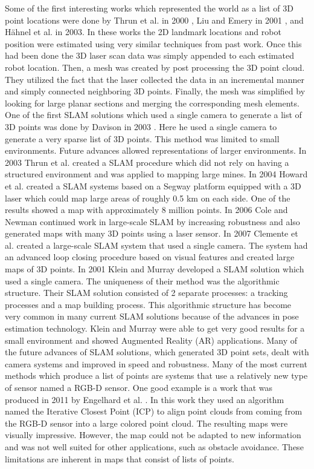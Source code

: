Some of the first interesting works which represented the world as a list
of 3D point locations were done by Thrun et al. in 2000 \cite{Thrun2000},
Liu and Emery in 2001 \cite{Liu2001}, and H\"{a}hnel et al. in 2003. In
these works the 2D landmark locations and robot position were estimated
using very similar techniques from past work. Once this had been done the 3D
laser scan data was simply appended to each estimated robot location. Then,
a mesh was created by post processing the 3D point cloud. They utilized the
fact that the laser collected the data in an incremental manner and simply
connected neighboring 3D points. Finally, the mesh was simplified by
looking for large planar sections and merging the corresponding mesh
elements. One of the first SLAM solutions which used a single camera to
generate a list of 3D points was done by Davison in 2003
\cite{Davison2003}. Here he used a single camera to generate a very sparse
list of 3D points. This method was limited to small environments. Future
advances allowed representations of larger environments. In 2003 Thrun et
al.  \cite{Thrun2003} created a SLAM procedure which did not rely on having
a structured environment and was applied to mapping large mines. In 2004
Howard et al. \cite{Howard2004} created a SLAM systems based on a Segway
platform equipped with a 3D laser which could map large areas of roughly 0.5
km on each side.  One of the results showed a map with approximately 8
million points. In 2006 Cole and Newman \cite{Cole2006} continued work in
large-scale SLAM by increasing robustness and also generated maps with many
3D points using a laser sensor. In 2007 Clemente et al. created a
large-scale SLAM system that used a single camera. The system had an
advanced loop closing procedure based on visual features and created large
maps of 3D points. In 2001 Klein and Murray \cite{Klein2007} developed a
SLAM solution which used a single camera. The uniqueness of their
method was the algorithmic structure. Their SLAM solution consisted of 2
separate processes: a tracking processes and a map building process. This
algorithmic structure has become very common in many current SLAM solutions
because of the advances in pose estimation technology. Klein and Murray
were able to get very good results for a small environment and showed
Augmented Reality (AR) applications.  Many of the future advances of SLAM
solutions, which generated 3D point sets, dealt with camera systems
\cite{Paz2008,Konolige2008,Strasdat2010} and improved in speed and
robustness. Many of the most current methods which produce a list of points
are systems that use a relatively new type of sensor named a RGB-D sensor.
One good example is a work that was produced in 2011 by Engelhard et al.
\cite{Engelhard2011}. In this work they used an algorithm named the
Iterative Closest Point (ICP) \cite{Rusinkiewicz} to align point clouds
from coming from the RGB-D sensor into a large colored point cloud.  The
resulting maps were visually impressive. However, the map could not be
adapted to new information and was not well suited for other applications,
such as obstacle avoidance. These limitations are inherent in maps that
consist of lists of points.


